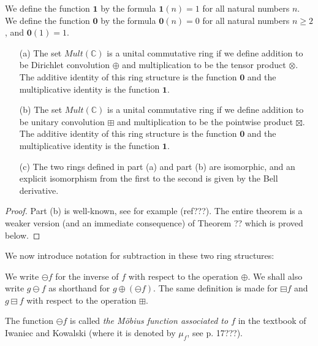 \begin{definition}
We define the function $\mathbf{1}$ by the formula $\mathbf{1}(n) = 1$ for all natural numbers $n$. We define the function $\mathbf{0}$ by the formula $\mathbf{0}(n) = 0$ for all natural numbers $n \geq 2$, and $\mathbf{0}(1) = 1$.
\end{definition}



\begin{theorem}
\begin{itemize}
\item[(a)] The set $Mult(\mathbb{C})$ is a unital commutative ring if we define addition to be Dirichlet convolution $\oplus$ and multiplication to be the tensor product $\otimes$. The additive identity of this ring structure is the function $\mathbf{0}$ and the multiplicative identity is the function $\mathbf{1}$. 
\item[(b)] The set $Mult(\mathbb{C})$ is a unital commutative ring if we define addition to be unitary convolution $\boxplus$ and multiplication to be the pointwise product $\boxtimes$. The additive identity of this ring structure is the function $\mathbf{0}$ and the multiplicative identity is the function $\mathbf{1}$.
\item[(c)] The two rings defined in part (a) and part (b) are isomorphic, and an explicit isomorphism from the first to the second is given by the Bell derivative. 
\end{itemize}
\end{theorem}
\begin{proof}
Part (b) is well-known, see for example (ref???). The entire theorem is a weaker version (and an immediate consequence) of Theorem ?? which is proved below.
\end{proof}

We now introduce notation for subtraction in these two ring structures:

\begin{definition}
We write $\ominus f$ for the inverse of $f$ with respect to the operation $\oplus$. We shall also write $g \ominus f$ as shorthand for $g \oplus (\ominus f)$. The same definition is made for $\boxminus f$ and $g \boxminus f$ with respect to the operation $\boxplus$.
\end{definition}

\begin{remark}
The function $\ominus f$ is called \emph{the M{\"o}bius function associated to $f$} in the textbook of Iwaniec and Kowalski (where it is denoted by $\mu_f$, see p. 17???).
\end{remark}

